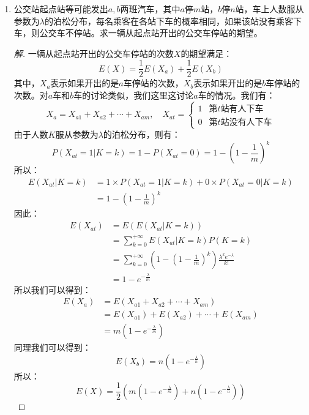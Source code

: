 \documentclass[12pt]{article}
\newcommand{\hei}{\CJKfamily{hei}}                          %
\begin{document}
\begin{enumerate}
\item {\hei 公交站起点站等可能发出$a,b$两班汽车，其中$a$停$m$站，$b$停$n$站，车上人数服从参数为$\lambda$的泊松分布，每名乘客在各站下车的概率相同，如果该站没有乘客下车，则公交车不停站。求一辆从起点站开出的公交车停站的期望。}
\begin{proof}[解]
	一辆从起点站开出的公交车停站的次数$X$的期望满足：
	\begin{equation}
	E(X)=\frac{1}{2}E(X_a)+\frac{1}{2}E(X_b)
	\end{equation}
	其中，$X_a$表示如果开出的是$a$车停站的次数，$X_b$表示如果开出的是$b$车停站的次数。对$a$车和$b$车的讨论类似，我们这里这讨论$a$车的情况。我们有：
	\begin{equation}
	X_a=X_{a1}+X_{a2}+\cdots+X_{am},\quad X_{at}=\left\{
	\begin{array}{cc}
	1 & \mbox{第$t$站有人下车}\\
	0 & \mbox{第$t$站没有人下车}
	\end{array}
	\right.
	\end{equation}
	由于人数$K$服从参数为$\lambda$的泊松分布，则有：
	\begin{equation}
	P(X_{at}=1|K=k)=1-P(X_{at}=0)=1-\left(1-\frac{1}{m}\right)^k
	\end{equation}
	所以：
	\begin{equation}
	\begin{aligned}
	E(X_{at}|K=k)&=1\times P(X_{at}=1|K=k)+0\times P(X_{at}=0|K=k) \\
	&=1-\left(1-\frac{1}{m}\right)^k
	\end{aligned}
	\end{equation}
	因此：
	\begin{equation}
	\begin{aligned}
	E(X_{at})&=E(E(X_{at}|K=k)) \\
	&=\sum_{k=0}^{+\infty}E(X_{at}|K=k)P(K=k) \\
	&=\sum_{k=0}^{+\infty}\left(1-\left(1-\frac{1}{m}\right)^k\right)\frac{\lambda^ke^{-\lambda}}{k!} \\
	&=1-e^{-\frac{\lambda}{m}}
	\end{aligned}
	\end{equation}
	所以我们可以得到：
	\begin{equation}
	\begin{aligned}
	E(X_a)&=E(X_{a1}+X_{a2}+\cdots+X_{am}) \\
	&=E(X_{a1})+E(X_{a2})+\cdots+E(X_{am}) \\
	&=m\left(1-e^{-\frac{\lambda}{m}}\right)
	\end{aligned}
	\end{equation}
	同理我们可以得到：
	\begin{equation}
	E(X_b)=n\left(1-e^{-\frac{\lambda}{n}}\right)
	\end{equation}
	所以：
	\begin{equation}
	E(X)=\frac{1}{2}\left(m\left(1-e^{-\frac{\lambda}{m}}\right)+n\left(1-e^{-\frac{\lambda}{n}}\right)\right)
	\end{equation}
\end{proof}
\end{enumerate}
\end{document}
